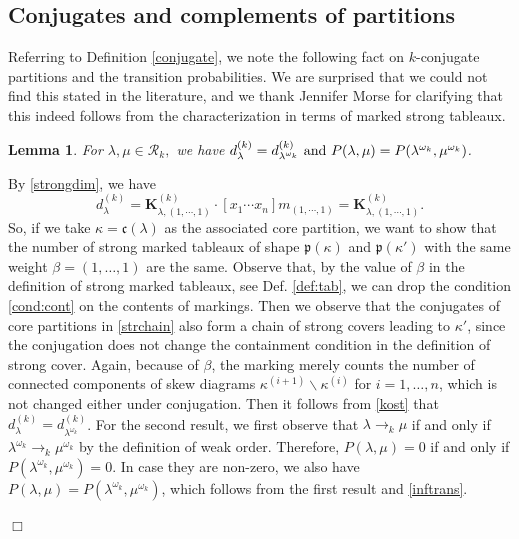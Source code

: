 \documentclass[11pt]{amsart}
\newtheorem{lemma}[theorem]{Lemma}
\newcommand{\bbox}{\hfill $\Box$}
\newcommand{\pf}{\noindent {\it Proof:} }
\newcommand{\tn}[1]{\textnormal{#1}}
\begin{document}
\subsection{Conjugates and complements of partitions}
 Referring to Definition \ref{conjugate}, we note the following fact on $k$-conjugate partitions and the transition probabilities. We are surprised that we could not find this stated in the literature, and we thank Jennifer Morse for clarifying that this indeed follows from the characterization in terms of marked strong tableaux.
\begin{lemma} \label{conj}
For $\lambda,\mu \in \mathcal{R}_k,$ we have
$d_{\lambda}^{(k)}=d_{\lambda^{\omega_k}}^{(k)} \tn{ and } P(\lambda,\mu)=P(\lambda^{\omega_k},\mu^{\omega_k})$.
\end{lemma}

\pf By \eqref{strongdim}, we have
\begin{equation} \label{kost}
    d_{\lambda}^{(k)}=\mathbf{K}_{\lambda, (1,\cdots,1)}^{(k)} \cdot [x_1\cdots x_n]m_{(1,\cdots,1)}=\mathbf{K}_{\lambda, (1,\cdots,1)}^{(k)}.
\end{equation}
 So, if we take $\kappa=\mathfrak{c}(\lambda)$ as the associated core partition, we want to show that the number of strong marked tableaux of shape $\mathfrak{p}(\kappa)$ and $\mathfrak{p}(\kappa')$ with the same weight $\beta=(1,\ldots,1)$ are the same. Observe that, by the value of $\beta$ in the definition of strong marked tableaux, see Def. \ref{def:tab},  we can drop the condition \eqref{cond:cont} on the contents of markings. Then we observe that the conjugates of core partitions in \eqref{strchain} also form a chain of strong covers leading to $\kappa'$, since the conjugation does not change the containment condition in the definition of strong cover. 
 Again, because of $\beta$, the marking merely counts the number of connected components of skew diagrams $\kappa^{(i+1)} \backslash \kappa^{(i)}$ for $i=1,\ldots,n$, which is not changed either under conjugation. Then it follows from \eqref{kost} that $d_{\lambda}^{(k)}=d_{\lambda^{\omega_k}}^{(k)}$. For the second result, we first observe that  $\lambda \rightarrow_k \mu$ if and only if $\lambda^{\omega_k} \rightarrow_k \mu^{\omega_k}$ by the definition of weak order. Therefore, $ P(\lambda,\mu)=0$ if and only if $P(\lambda^{\omega_k},\mu^{\omega_k})=0.$ In case they are non-zero, we also have $ P(\lambda,\mu)=P(\lambda^{\omega_k},\mu^{\omega_k})$, which follows from the first result and \eqref{inftrans}. 
 
\bbox
\end{document}
